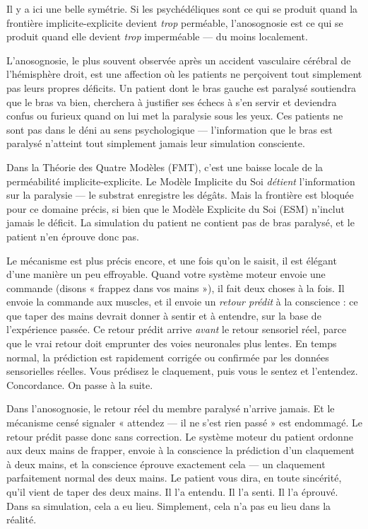 \documentclass[11pt, twoside, openright]{book}
\begin{document}
Il y a ici une belle symétrie. Si les psychédéliques sont ce qui se produit quand la frontière implicite-explicite devient \textit{trop} perméable, l'anosognosie est ce qui se produit quand elle devient \textit{trop} imperméable --- du moins localement.

L'anosognosie, le plus souvent observée après un accident vasculaire cérébral de l'hémisphère droit, est une affection où les patients ne perçoivent tout simplement pas leurs propres déficits. Un patient dont le bras gauche est paralysé soutiendra que le bras va bien, cherchera à justifier ses échecs à s'en servir et deviendra confus ou furieux quand on lui met la paralysie sous les yeux. Ces patients ne sont pas dans le déni au sens psychologique --- l'information que le bras est paralysé n'atteint tout simplement jamais leur simulation consciente.

Dans la Théorie des Quatre Modèles (FMT), c'est une baisse locale de la perméabilité implicite-explicite. Le Modèle Implicite du Soi \textit{détient} l'information sur la paralysie --- le substrat enregistre les dégâts. Mais la frontière est bloquée pour ce domaine précis, si bien que le Modèle Explicite du Soi (ESM) n'inclut jamais le déficit. La simulation du patient ne contient pas de bras paralysé, et le patient n'en éprouve donc pas.

Le mécanisme est plus précis encore, et une fois qu'on le saisit, il est élégant d'une manière un peu effroyable. Quand votre système moteur envoie une commande (disons « frappez dans vos mains »), il fait deux choses à la fois. Il envoie la commande aux muscles, et il envoie un \textit{retour prédit} à la conscience : ce que taper des mains devrait donner à sentir et à entendre, sur la base de l'expérience passée. Ce retour prédit arrive \textit{avant} le retour sensoriel réel, parce que le vrai retour doit emprunter des voies neuronales plus lentes. En temps normal, la prédiction est rapidement corrigée ou confirmée par les données sensorielles réelles. Vous prédisez le claquement, puis vous le sentez et l'entendez. Concordance. On passe à la suite.

Dans l'anosognosie, le retour réel du membre paralysé n'arrive jamais. Et le mécanisme censé signaler « attendez --- il ne s'est rien passé » est endommagé. Le retour prédit passe donc sans correction. Le système moteur du patient ordonne aux deux mains de frapper, envoie à la conscience la prédiction d'un claquement à deux mains, et la conscience éprouve exactement cela --- un claquement parfaitement normal des deux mains. Le patient vous dira, en toute sincérité, qu'il vient de taper des deux mains. Il l'a entendu. Il l'a senti. Il l'a éprouvé. Dans sa simulation, cela a eu lieu. Simplement, cela n'a pas eu lieu dans la réalité.
\end{document}
